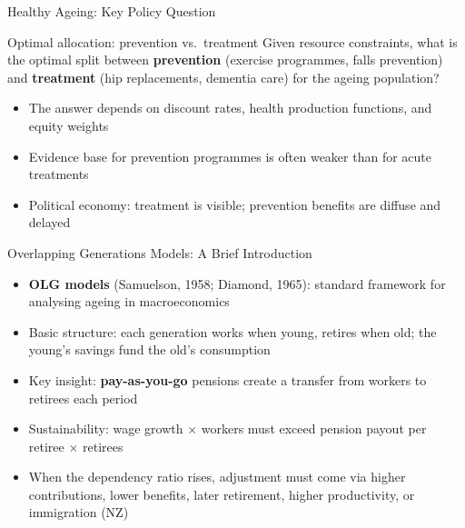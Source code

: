 \documentclass[aspectratio=169, 12pt]{beamer}
\begin{document}
\begin{frame}{Healthy Ageing: Key Policy Question}
  \begin{alertblock}{Optimal allocation: prevention vs.\ treatment}
    Given resource constraints, what is the optimal split between \textbf{prevention}
    (exercise programmes, falls prevention) and \textbf{treatment} (hip replacements,
    dementia care) for the ageing population?
  \end{alertblock}
  \begin{itemize}
    \item The answer depends on discount rates, health production functions, and equity weights
    \item Evidence base for prevention programmes is often weaker than for acute treatments
    \item Political economy: treatment is visible; prevention benefits are diffuse and delayed
  \end{itemize}
\end{frame}

\begin{frame}{Overlapping Generations Models: A Brief Introduction}
  \small
  \begin{itemize}
    \item \textbf{OLG models} (Samuelson, 1958; Diamond, 1965): standard framework for
          analysing ageing in macroeconomics
    \item Basic structure: each generation works when young, retires when old; the young's
          savings fund the old's consumption
    \item Key insight: \textbf{pay-as-you-go} pensions create a transfer from workers to
          retirees each period
    \item Sustainability: wage growth $\times$ workers must exceed pension payout
          per retiree $\times$ retirees
    \item When the dependency ratio rises, adjustment must come via higher contributions,
          lower benefits, later retirement, higher productivity, or immigration (NZ)
  \end{itemize}
\end{frame}

\end{document}
